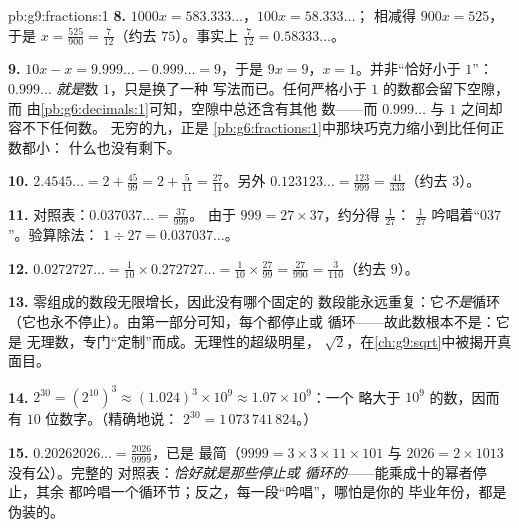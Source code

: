 \begin{solution}{pb:g9:fractions:1}
\textbf{8.} $1000x = 583.333\ldots$，$100x = 58.333\ldots$；
相减得 $900x = 525$，于是
$x = \frac{525}{900} = \frac{7}{12}$（约去 $75$）。事实上
$\frac{7}{12} = 0.58333\ldots$。

\textbf{9.} $10x - x = 9.999\ldots - 0.999\ldots = 9$，于是
$9x = 9$，$x = 1$。并非“恰好小于 $1$”：
$0.999\ldots$ \emph{就是}数 $1$，只是换了一种
写法而已。任何严格小于 $1$ 的数都会留下空隙，而
由\cref{pb:g6:decimals:1}可知，空隙中总还含有其他
数——而 $0.999\ldots$ 与 $1$ 之间却容不下任何数。
无穷的九，正是
\cref{pb:g6:fractions:1}中那块巧克力缩小到比任何正数都小：
什么也没有剩下。

\textbf{10.} $2.4545\ldots = 2 + \frac{45}{99} = 2 +
\frac{5}{11} = \frac{27}{11}$。另外
$0.123123\ldots = \frac{123}{999} = \frac{41}{333}$（约去
$3$）。

\textbf{11.} 对照表：$0.037037\ldots = \frac{37}{999}$。
由于 $999 = 27 \times 37$，约分得 $\frac{1}{27}$：
 $\frac{1}{27}$ 吟唱着“$037$”。验算除法：
$1 \div 27 = 0.037037\ldots$。

\textbf{12.} $0.0272727\ldots = \frac{1}{10} \times
0.272727\ldots = \frac{1}{10} \times \frac{27}{99}
= \frac{27}{990} = \frac{3}{110}$（约去 $9$）。

\textbf{13.} 零组成的数段无限增长，因此没有哪个固定的
数段能永远重复：它\emph{不是}循环
（它也永不停止）。由第一部分可知，每个都停止或
循环——故此数根本不是：它是
无理数，专门“定制”而成。无理性的超级明星，
$\sqrt2$，在\cref{ch:g9:sqrt}中被揭开真面目。

\textbf{14.} $2^{30} = \left(2^{10}\right)^3 \approx
(1.024)^3 \times 10^9 \approx 1.07 \times 10^9$：一个
略大于 $10^9$ 的数，因而有 $10$ 位数字。（精确地说：
$2^{30} = 1\,073\,741\,824$。）

\textbf{15.} $0.20262026\ldots = \frac{2026}{9999}$，已是
最简（$9999 = 3 \times 3 \times 11 \times 101$ 与
$2026 = 2 \times 1013$ 没有公）。完整的
对照表：\emph{恰好就是那些停止或
循环的}——能乘成十的幂者停止，其余
都吟唱一个循环节；反之，每一段“吟唱”，哪怕是你的
毕业年份，都是伪装的。
\end{solution}
